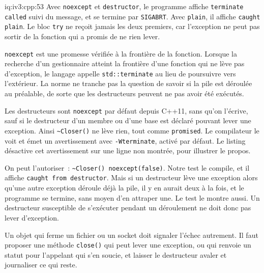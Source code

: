 \begin{solution}{iq:iv3:cpp:53}
Avec \texttt{noexcept} et \texttt{destructor}, le programme affiche \texttt{terminate called} suivi du message, et se termine par \texttt{SIGABRT}. Avec \texttt{plain}, il affiche \texttt{caught plain}. Le bloc \texttt{try} ne reçoit jamais les deux premiers, car l'exception ne peut pas sortir de la fonction qui a promis de ne rien lever.

\texttt{noexcept} est une promesse vérifiée à la frontière de la fonction. Lorsque la recherche d'un gestionnaire atteint la frontière d'une fonction qui ne lève pas d'exception, le langage appelle \texttt{std::terminate} au lieu de poursuivre vers l'extérieur. La norme ne tranche pas la question de savoir si la pile est déroulée au préalable, de sorte que les destructeurs peuvent ne pas avoir été exécutés.

Les destructeurs sont \texttt{noexcept} par défaut depuis C++11, sans qu'on l'écrive, sauf si le destructeur d'un membre ou d'une base est déclaré pouvant lever une exception. Ainsi \texttt{\textasciitilde{}Closer()} ne lève rien, tout comme \texttt{promised}. Le compilateur le voit et émet un avertissement avec \texttt{-Wterminate}, activé par défaut. Le listing désactive cet avertissement sur une ligne non montrée, pour illustrer le propos.

On peut l'autoriser~: \texttt{\textasciitilde{}Closer() noexcept(false)}. Notre test le compile, et il affiche \texttt{caught from destructor}. Mais si un destructeur lève une exception alors qu'une autre exception déroule déjà la pile, il y en aurait deux à la fois, et le programme se termine, sans moyen d'en attraper une. Le test le montre aussi. Un destructeur susceptible de s'exécuter pendant un déroulement ne doit donc pas lever d'exception.

Un objet qui ferme un fichier ou un socket doit signaler l'échec autrement. Il faut proposer une méthode \texttt{close()} qui peut lever une exception, ou qui renvoie un statut pour l'appelant qui s'en soucie, et laisser le destructeur avaler et journaliser ce qui reste.

\end{solution}

